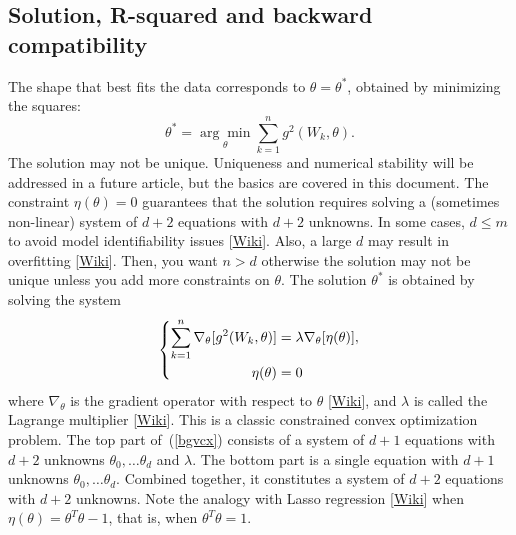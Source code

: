 \documentclass[oneside,10pt]{book}
\begin{document}
\subsection{Solution, R-squared and backward compatibility}

The shape that best fits the data corresponds to $\theta=\theta^*$, obtained by minimizing the squares:
\begin{equation}
\theta^* = \underset{\theta}{\arg\min} \sum_{k=1}^n g^2(W_k,\theta).\label{tyrefd}
\end{equation}
The solution may not be unique. Uniqueness and \textcolor{index}{numerical stability} will be addressed in a future article, but the basics are covered in this document. The constraint $\eta(\theta)=0$ guarantees that the solution requires solving a (sometimes non-linear) 
 system of $d+2$ equations with $d+2$  unknowns. In some cases, $d\leq m$ to avoid \textcolor{index}{model identifiability} issues
 [\href{https://en.wikipedia.org/wiki/Identifiability}{Wiki}]. Also, a large $d$ may result in \textcolor{index}{overfitting} 
 [\href{https://en.wikipedia.org/wiki/Overfitting}{Wiki}].  Then, you want $n > d$ otherwise the solution may  not be unique unless you add more 
 constraints on $\theta$. The solution $\theta^*$ is obtained by solving the system
\begin{equation}
\centering
\left\{\begin{split}
 \sum_{k=1}^n \nabla_\theta [g^2(W_k,\theta)] & =\lambda \nabla_\theta [\eta(\theta)],\\
 \eta(\theta) & =0 \\
\end{split}\right. \label{bgvcx}
\end{equation}
where $\nabla_\theta$ is the \textcolor{index}{gradient} operator with respect to $\theta$ [\href{https://en.wikipedia.org/wiki/Gradient}{Wiki}], and $\lambda$ is called the \textcolor{index}{Lagrange multiplier} [\href{https://en.wikipedia.org/wiki/Lagrange_multiplier}{Wiki}]. This is a classic constrained convex optimization problem. The top part of~(\ref{bgvcx}) consists of a system of $d+1$ equations with $d+2$ unknowns 
  $\theta_0,\dots\theta_d$ and $\lambda$. The bottom part is a single equation with $d+1$ unknowns  $\theta_0,\dots\theta_d$. Combined together,
 it constitutes a system of $d+2$ equations with $d+2$ unknowns. Note the analogy with \textcolor{index}{Lasso regression} 
 [\href{https://en.wikipedia.org/wiki/Lasso_(statistics)}{Wiki}] when $\eta(\theta)=\theta^T\theta - 1$, that is, when $\theta^T\theta=1$. 
\end{document}
